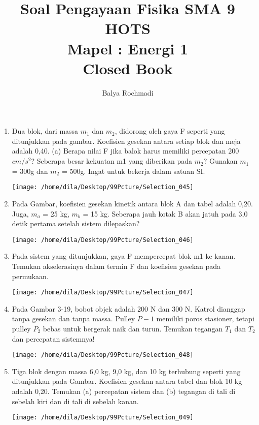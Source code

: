 \documentclass[12pt,a4paper,draft,final,oneside,twoside,openright,openany]{article}
\author{Balya Rochmadi}
\title{Soal Pengayaan Fisika SMA 9 HOTS\\Mapel : Energi 1 \\Closed Book}
\begin{document}
	\maketitle
	\Large
	\noindent\makebox[\linewidth]{\rule{\paperwidth}{0.4pt}}
	\begin{enumerate}
		\item Dua blok, dari massa $m_1$ dan $m_2$, didorong oleh gaya F seperti yang ditunjukkan pada gambar. Koefisien gesekan antara setiap blok dan meja adalah 0,40. (a) Berapa nilai F jika balok harus memiliki percepatan 200 $cm/s^2$? Seberapa besar kekuatan m1 yang diberikan pada $m_2$? Gunakan $m_1$ = 300g dan $m_2$ = 500g. Ingat untuk bekerja dalam satuan SI.
			\begin{center}
				\texttt{[image: /home/dila/Desktop/99Pcture/Selection\_045]}
			\end{center}
		\item Pada Gambar, koefisien gesekan kinetik antara blok A dan tabel adalah 0,20. Juga, $m_a$ = 25 kg, $m_b$ = 15 kg. Seberapa jauh kotak B akan jatuh pada 3,0 detik pertama setelah sistem dilepaskan?
					\begin{center}
						\texttt{[image: /home/dila/Desktop/99Pcture/Selection\_046]}
					\end{center}
		\item Pada sistem yang ditunjukkan, gaya F mempercepat blok m1 ke kanan. Temukan akselerasinya dalam termin F dan koefisien gesekan pada permukaan.
		\begin{center}
			\texttt{[image: /home/dila/Desktop/99Pcture/Selection\_047]}
		\end{center}
		\item Pada Gambar 3-19, bobot objek adalah 200 N dan 300 N. Katrol dianggap tanpa gesekan dan tanpa massa. Pulley $P-1$ memiliki poros stasioner, tetapi pulley $P_2$ bebas untuk bergerak naik dan turun. Temukan tegangan $T_1$ dan $T_2$ dan percepatan sistemnya!
			\begin{center}
				\texttt{[image: /home/dila/Desktop/99Pcture/Selection\_048]}
			\end{center}
		\item Tiga blok dengan massa 6,0 kg, 9,0 kg, dan 10 kg terhubung seperti yang ditunjukkan pada Gambar. Koefisien gesekan antara tabel dan blok 10 kg adalah 0,20. Temukan (a) percepatan sistem dan (b) tegangan di tali di sebelah kiri dan di tali di sebelah kanan.
		\begin{center}
			\texttt{[image: /home/dila/Desktop/99Pcture/Selection\_049]}
		\end{center}
		
		
	\end{enumerate}
\end{document}

